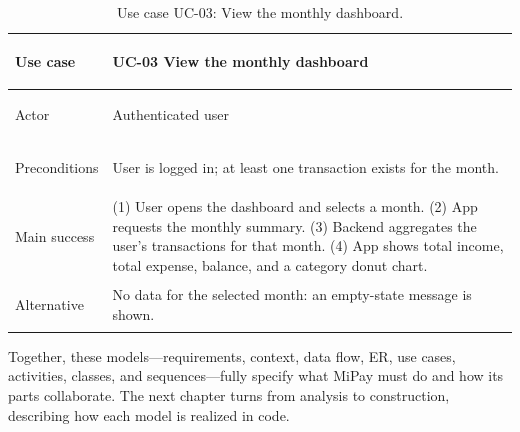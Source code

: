 \begin{table}[H]
\centering
\caption{Use case UC-03: View the monthly dashboard.}
\label{tab:uc-dash}
\small
\renewcommand{\arraystretch}{1.3}
\begin{tabularx}{\textwidth}{>{\bfseries\raggedright\arraybackslash}p{3cm} X}
\toprule
Use case & UC-03 View the monthly dashboard \\
\midrule
Actor & Authenticated user \\
Preconditions & User is logged in; at least one transaction exists for the month. \\
Main success & (1) User opens the dashboard and selects a month. (2) App requests the monthly summary. (3) Backend aggregates the user's transactions for that month. (4) App shows total income, total expense, balance, and a category donut chart. \\
Alternative & No data for the selected month: an empty-state message is shown. \\
\bottomrule
\end{tabularx}
\end{table}

Together, these models---requirements, context, data flow, ER, use cases,
activities, classes, and sequences---fully specify what MiPay must do and how its
parts collaborate. The next chapter turns from analysis to construction,
describing how each model is realized in code.
